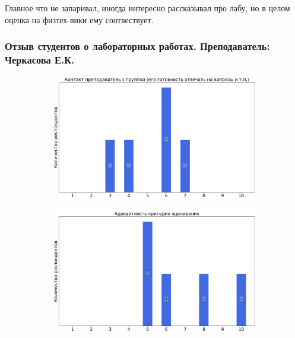             \begin{commentbox} 
                Главное что не запаривал, иногда интересно рассказывал про лабу, но в целом оценка на физтех-вики ему соотвествует. 
            \end{commentbox}


    \subsubsection{Отзыв студентов о лабораторных работах. Преподаватель: Черкасова Е.К.}
        \begin{figure}[H]
            \centering
            \begin{subfigure}[b]{0.45\textwidth}
                \centering
                \includegraphics[width=\textwidth]{images/1 course/Общая физика - механика/labniks-marks-Черкасова Е.К.-0.png}
            \end{subfigure}
            \begin{subfigure}[b]{0.45\textwidth}
                \centering
                \includegraphics[width=\textwidth]{images/1 course/Общая физика - механика/labniks-marks-Черкасова Е.К.-1.png}

\end{subfigure}
\end{figure}
